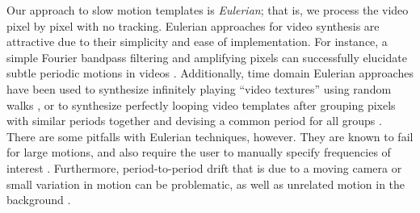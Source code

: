 \documentclass{article}
\begin{document}
Our approach to slow motion templates is {\em Eulerian}; that is, we process the video pixel by pixel with no tracking.  Eulerian approaches for video synthesis are attractive due to their simplicity and ease of implementation.  For instance, a simple Fourier bandpass filtering and amplifying pixels can successfully elucidate subtle periodic motions in videos \cite{wu2012eulerian, wadhwa2013phase}.  Additionally, time domain Eulerian approaches have been used to synthesize infinitely playing ``video textures'' using random walks \cite{schodl2000video}, or to synthesize perfectly looping video templates after grouping pixels with similar periods together and devising a common period for all groups \cite{Liao2013VideoLoops,Liao2015VideoLoops}.  There are some pitfalls with Eulerian techniques, however.  They are known to fail for large motions, and also require the user to manually specify frequencies of interest \cite{wu2012eulerian, wadhwa2013phase}.  Furthermore, period-to-period drift that is due to a moving camera or small variation in motion can be problematic, as well as unrelated motion in the background \cite{stauffer1999adaptive}.
\end{document}
